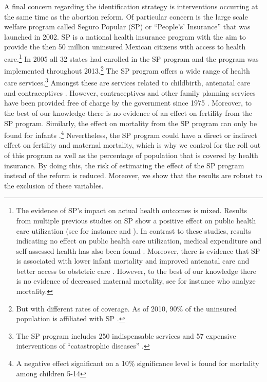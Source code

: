 \documentclass[a4paper, 11pt]{article}
\begin{document}
\begin{spacing}{2}
A final concern regarding the identification strategy is interventions occurring at the same time as the abortion reform. Of particular concern is the large scale welfare program called Seguro Popular (SP) or ``People's' Insurance'' that was launched in 2002. SP is a national health insurance program with the aim to provide the then 50 million uninsured Mexican citizens with access to health care.\footnote{The evidence of SP's impact on actual health outcomes is mixed. Results from multiple previous studies on SP show a positive effect on public health care utilization (see for instance \cite{knox_health_2008} and \cite{barros2008wealthier}). In contrast to these studies, results indicating no effect on public health care utilization, medical expenditure and self-assessed health has also been found \cite{king2009public}. Moreover, there is evidence that SP is associated with lower infant mortality and improved antenatal care \citep{conti2014evaluating} and better access to obstetric care \citep{sosa2009heterogeneous}. However, to the best of our knowledge there is no evidence of decreased maternal mortality, see for instance \citep{conti2014evaluating} who analyze mortality.} In 2005 all 32 states had enrolled in the SP program \citep{knaul__2007} and the program was implemented throughout 2013.\footnote{But with different rates of coverage. As of 2010, 90\% of the uninsured population is affiliated with SP \citep{bosch2012taking}.} The SP program offers a wide range of health care services.\footnote{The SP program includes 250 indispensable services and 57 expensive interventions of ``catastrophic diseases'' \citep{Darney2015}.} Amongst these are services related to childbirth, antenatal care \citep{knox_health_2008} and contraceptives \citep{Darney2015}. However, contraceptives and other family planning services have been provided free of charge by the government since 1975 \citep{GIRE2009}. Moreover, to the best of our knowledge there is no evidence of an effect on fertility from the SP program. Similarly, the effect on mortality from the SP program can only be found for infants \citep{conti2014evaluating}.\footnote{A negative effect significant on a 10\% significance level is found for mortality among children 5-14} Nevertheless, the SP program could have a direct or indirect effect on fertility and maternal mortality, which is why we control for the roll out of this program as well as the percentage of population that is covered by health insurance. By doing this, the risk of estimating the effect of the SP program instead of the reform is reduced. Moreover, we show that the results are robust to the exclusion of these variables. 



\end{spacing}
\end{document}
